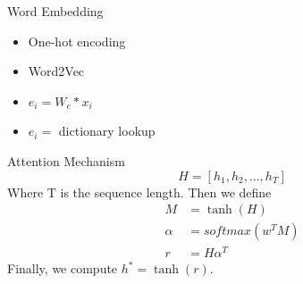\documentclass{beamer}
\begin{document}
	\begin{frame}{Word Embedding}
		\begin{itemize}
			\item One-hot encoding 
			\item Word2Vec\cite{Mikolov2013}
		\end{itemize}
		\begin{itemize}
			\item $e_i = W_e * x_i$
			\item $e_i = $ dictionary lookup
		\end{itemize} 
	\end{frame}
	\begin{frame}{Attention Mechanism}
		\begin{equation}
			 H = [h_1,h_2,...,h_T]
		\end{equation}
		Where T is the sequence length. 
		Then we define 
		\begin{align}
		 M &= \tanh(H)\\
		 \alpha &= softmax(w^TM) \\
		 r &= H \alpha^T 
		\end{align}
		Finally, we compute $h^* = \tanh(r)$.
	\end{frame}
\end{document}
